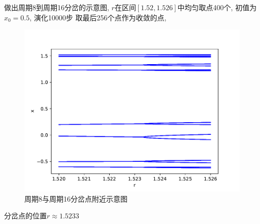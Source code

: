 \documentclass[a4paper,zihao=5,UTF8]{ctexart}
\begin{document}
    \par 
    做出周期8到周期16分岔的示意图, $r$在区间$[1.52,1.526]$中均匀取点400个, 初值为$x_0 = 0.5$, 演化10000步
    取最后256个点作为收敛的点,
    \begin{figure}[htbp]
        \centering
        \includegraphics[scale=0.5]{9_3_4.pdf}
        \caption{周期8与周期16分岔点附近示意图}
    \end{figure}
    \par 
    分岔点的位置$r \approx 1.5233$
\end{document}
